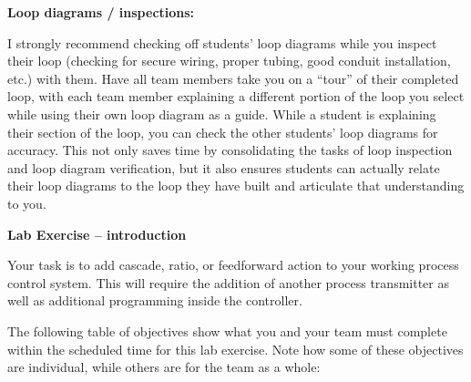 \vskip 10pt














\noindent
{\bf Loop diagrams / inspections:}

I strongly recommend checking off students' loop diagrams while you inspect their loop (checking for secure wiring, proper tubing, good conduit installation, etc.) with them.  Have all team members take you on a ``tour'' of their completed loop, with each team member explaining a different portion of the loop you select while using their own loop diagram as a guide.  While a student is explaining their section of the loop, you can check the other students' loop diagrams for accuracy.  This not only saves time by consolidating the tasks of loop inspection and loop diagram verification, but it also ensures students can actually relate their loop diagrams to the loop they have built and articulate that understanding to you.






\noindent
{\bf Lab Exercise -- introduction}

\vskip 5pt

Your task is to add cascade, ratio, or feedforward action to your working process control system.  This will require the addition of another process transmitter as well as additional programming inside the controller.

The following table of objectives show what you and your team must complete within the scheduled time for this lab exercise.  Note how some of these objectives are individual, while others are for the team as a whole:




